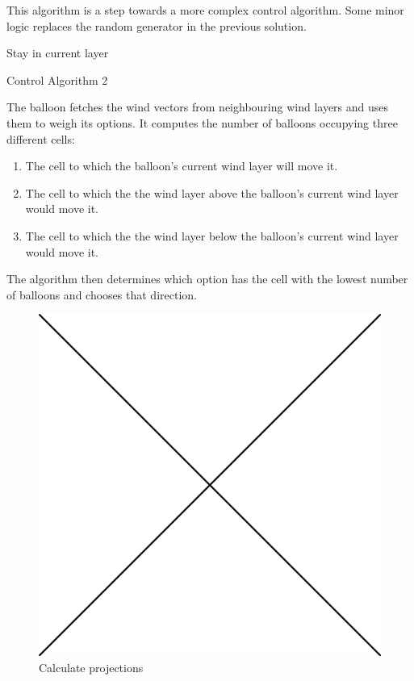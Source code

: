 This algorithm is a step towards a more complex control algorithm. Some minor logic replaces the random generator in the previous solution. 

\begin{algorithm}[H]
 \Else
 {Stay in current layer}
 \caption{Control Algorithm 2}
 \label{alg2}
\end{algorithm}

The balloon fetches the wind vectors from neighbouring wind layers and uses them to weigh its options. It computes the number of balloons occupying three different cells:
\begin{enumerate}
\item The cell to which the balloon's current wind layer will move it.
\item The cell to which the the wind layer above the balloon's current wind layer would move it.
\item The cell to which the the wind layer below the balloon's current wind layer would move it.
\end{enumerate}

The algorithm then determines which option has the cell with the lowest number of balloons and chooses that direction.
\begin{figure}
\centering
\includegraphics[scale=0.2]{graphics/todo.png}
\caption{Calculate projections}
\label{fig:projections}
\end{figure}

